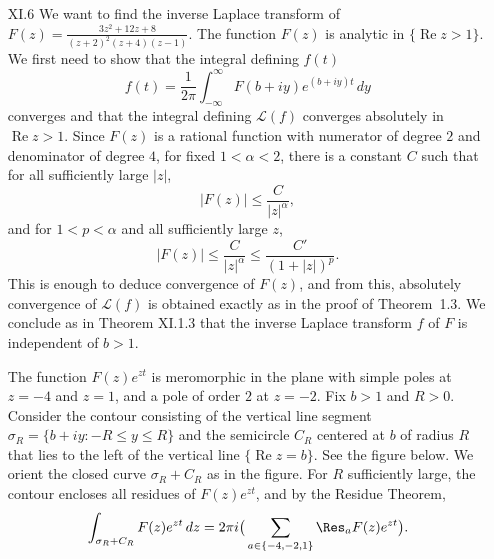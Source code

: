 \documentclass[11pt]{book}
\theoremstyle{definition}
\renewcommand{\Re}{\operatorname{Re}}
\begin{document}
\begin{enumerate}
  \item[XI.6]   We want to find the inverse Laplace transform of $F(z) = \frac{3z^2 + 12z + 8}{(z+2)^2 (z+4)(z-1)}$.  The function $F(z)$ is analytic in $\{ \Re z > 1\}$.  We first need to show that the integral defining $f(t)$ 
    \[ f(t) = \frac{1}{2\pi} \int_{-\infty}^\infty F(b+iy) e^{(b+iy)t} \, dy \] converges and that the integral defining $\mathcal L(f)$ converges absolutely in $\Re z > 1$.  Since $F(z)$ is a rational function with numerator of degree $2$ and denominator of degree $4$, for fixed $1 < \alpha  < 2$, there is a constant $C$ such that for all sufficiently large $|z|$,
    \[ |F(z)| \leq \frac{C}{|z|^\alpha}, \]  and for $1 < p < \alpha$ and all sufficiently large $z$,
    \[ |F(z)| \leq \frac{C}{|z|^\alpha} \leq \frac{C'}{(1+|z|)^p} .\]  This is enough to deduce convergence of $F(z)$, and from this, absolutely convergence of $\mathcal L(f)$ is obtained exactly as in the proof of Theorem~1.3.  
    We conclude as in Theorem XI.1.3 that the inverse Laplace transform $f$ of $F$ is independent of $b>1$.   

    The function $F(z) e^{zt}$ is meromorphic in the plane with simple poles at $z=-4$ and $z=1$, and a pole of order $2$ at $z=-2$.   Fix $b>1$ and $R>0$.   Consider the contour consisting of the vertical line segment $\sigma_R = \{ b + iy : -R \leq y \leq R \}$ and the semicircle $C_R$ centered at $b$ of radius $R$ that lies to the left of the vertical line $\{ \Re z = b \}$.  See the figure below.  We orient the closed curve $\sigma_R + C_R$ as in the figure.    For $R$ sufficiently large, the contour encloses all residues of $F(z)e^{zt}$, and by the Residue Theorem,
    \[ \int_{\sigma_R + C_R} F(z) e^{zt} \, dz = 2\pi i \big( \sum_{a \in \{ -4, -2, 1 \}} \Res_a F(z) e^{zt} \big)  . \] 


\end{enumerate}
\end{document}
